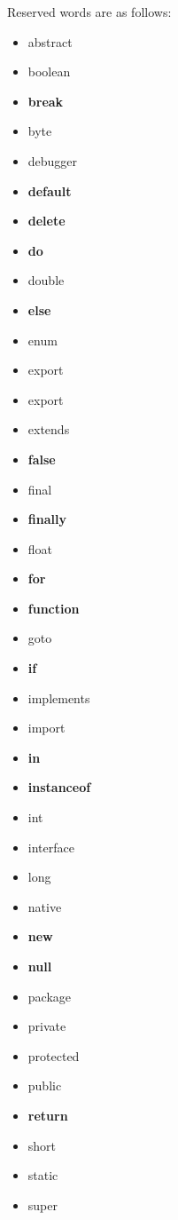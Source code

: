 			Reserved words are as follows:
			\begin{multicols}{3}
				\begin{itemize}
					\item abstract
					\item boolean
					\item \textbf{break}
					\item byte
					\item debugger
					\item \textbf{default}
					\item \textbf{delete}
					\item \textbf{do}
					\item double
					\item \textbf{else}
					\item enum
					\item export
					\item export
					\item extends
					\item \textbf{false}
					\item final
					\item \textbf{finally}
					\item float
					\item \textbf{for}
					\item \textbf{function}
					\item goto
					\item \textbf{if}
					\item implements
					\item import
					\item \textbf{in}
					\item \textbf{instanceof}
					\item int
					\item interface
					\item long
					\item native 
					\item \textbf{new}
					\item \textbf{null}
					\item package
					\item private
					\item protected
					\item public
					\item \textbf{return} 
					\item short
					\item static 
					\item super

\end{itemize}
\end{multicols}
